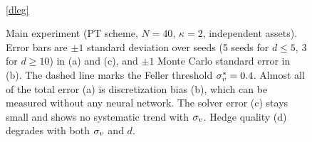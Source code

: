 {\begin{figure}[t]
\\[2pt]
\ref{dleg}
\caption{Main experiment (PT scheme, $N=40$, $\kappa=2$, independent assets). Error bars are $\pm1$ standard deviation over seeds (5 seeds for $d\le5$, 3 for $d\ge10$) in (a) and (c), and $\pm1$ Monte Carlo standard error in (b). The dashed line marks the Feller threshold $\sigma_v^*=0.4$. Almost all of the total error (a) is discretization bias (b), which can be measured without any neural network. The solver error (c) stays small and shows no systematic trend with $\sigma_v$. Hedge quality (d) degrades with both $\sigma_v$ and $d$.}
\label{fig:landscape}
\end{figure}}

